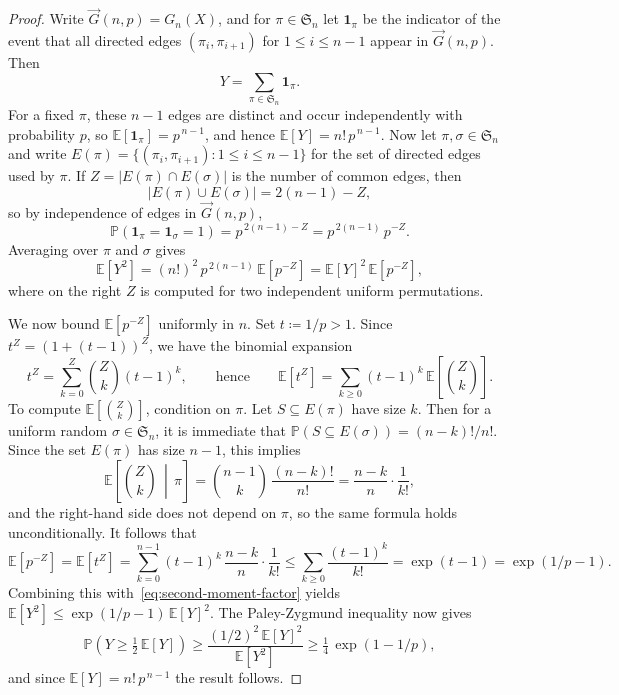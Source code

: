 \documentclass[12pt]{amsart}
\theoremstyle{definition}
\theoremstyle{remark}
\newcommand{\Sset}{\mathfrak{S}}
\begin{document}
\begin{proof}
Write \(\vec{G}(n,p)=G_n(X)\), and for \(\pi\in\Sset_n\) let \(\mathbf{1}_\pi\) be the indicator of the event that all
directed edges \((\pi_i,\pi_{i+1})\) for \(1\le i\le n-1\) appear in \(\vec{G}(n,p)\).
Then
\[
Y=\sum_{\pi\in\Sset_n}\mathbf{1}_\pi.
\]
For a fixed \(\pi\), these \(n-1\) edges are distinct and occur independently with probability \(p\), so
\(\mathbb{E}[\mathbf{1}_\pi]=p^{\,n-1}\), and hence \(\mathbb{E}[Y]=n!\,p^{\,n-1}\). Now let \(\pi,\sigma\in\Sset_n\) and write \(E(\pi)=\{(\pi_i,\pi_{i+1}):1\le i\le n-1\}\) for the set
of directed edges used by \(\pi\).
If \(Z=|E(\pi)\cap E(\sigma)|\) is the number of common edges, then
\[
|E(\pi)\cup E(\sigma)|=2(n-1)-Z,
\]
so by independence of edges in \(\vec{G}(n,p)\),
\[
\mathbb{P}(\mathbf{1}_\pi=\mathbf{1}_\sigma=1)=p^{\,2(n-1)-Z}=p^{\,2(n-1)}\,p^{-Z}.
\]
Averaging over \(\pi\) and \(\sigma\) gives
\begin{equation}\label{eq:second-moment-factor}
\mathbb{E}[Y^2]=(n!)^2\,p^{\,2(n-1)}\,\mathbb{E}\!\left[p^{-Z}\right]=\mathbb{E}[Y]^2\,\mathbb{E}\!\left[p^{-Z}\right],
\end{equation}
where on the right \(Z\) is computed for two independent uniform permutations.

We now bound \(\mathbb{E}[p^{-Z}]\) uniformly in \(n\).
Set \(t\coloneqq 1/p>1\).  Since \(t^Z=(1+(t-1))^Z\), we have the binomial expansion
\[
t^Z=\sum_{k=0}^{Z}\binom{Z}{k}(t-1)^k,
\qquad\text{hence}\qquad
\mathbb{E}[t^Z]=\sum_{k\ge 0}(t-1)^k\,\mathbb{E}\!\left[\binom{Z}{k}\right].
\]
To  compute \(\mathbb{E}[\binom{Z}{k}]\), condition on \(\pi\). Let $S \subseteq E(\pi)$ have size $k$.
Then for a uniform random \(\sigma\in\Sset_n\), it is immediate that
\(\mathbb{P}(S\subseteq E(\sigma))=(n-k)!/n!\). Since the set \(E(\pi)\) has size \(n-1\), this implies
\[
\mathbb{E}\!\left[\binom{Z}{k}\,\middle|\,\pi\right]
=
\binom{n-1}{k}\,\frac{(n-k)!}{n!}
=
\frac{n-k}{n}\cdot\frac{1}{k!},
\]
and the right-hand side does not depend on \(\pi\), so the same formula holds unconditionally.
It follows that
\[
\mathbb{E}[p^{-Z}]=\mathbb{E}[t^Z]
=\sum_{k=0}^{n-1}(t-1)^k\,\frac{n-k}{n}\cdot\frac{1}{k!}
\le \sum_{k\ge 0}\frac{(t-1)^k}{k!}
=\exp(t-1)=\exp(1/p-1).
\]
Combining this with~\eqref{eq:second-moment-factor} yields \(\mathbb{E}[Y^2]\le \exp(1/p-1)\,\mathbb{E}[Y]^2\).
The Paley-Zygmund inequality now gives
\[
\mathbb{P}\!\left(Y\ge \tfrac12\,\mathbb{E}[Y]\right)
\ge
\frac{(1/2)^2\,\mathbb{E}[Y]^2}{\mathbb{E}[Y^2]}
\ge \tfrac14\,\exp(1-1/p),
\]
and since \(\mathbb{E}[Y]=n!\,p^{\,n-1}\) the result follows.
\end{proof}
\end{document}
